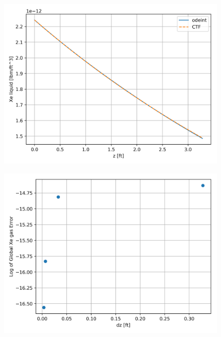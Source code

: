 \begin{figure}[p] 
\centering
\begin{minipage}{.5\textwidth}
  \centering
  \includegraphics[width=.9\linewidth]{images/transportSpeciesIntAreaXeLiq.png}
  \label{fig:IntArea_source_xe_liq_sol}
\end{minipage}%
\begin{minipage}{.5\textwidth}
  \centering
  \includegraphics[width=.9\linewidth]{images/transportedSpeciesIntAreaXeLiqError.png}
  \label{fig:IntArea_source_xe_liq_error}
\end{minipage}
\end{figure}
\FloatBarrier
\newpage

